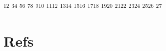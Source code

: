 \documentclass[
]{article}
\author{}
\date{}
\begin{document}
\textsuperscript{1}\textsuperscript{2}
\textsuperscript{3}\textsuperscript{4}
\textsuperscript{5}\textsuperscript{6}
\textsuperscript{7}\textsuperscript{8}
\textsuperscript{9}\textsuperscript{10}
\textsuperscript{11}\textsuperscript{12}
\textsuperscript{13}\textsuperscript{14}
\textsuperscript{15}\textsuperscript{16}
\textsuperscript{17}\textsuperscript{18}
\textsuperscript{19}\textsuperscript{20}
\textsuperscript{21}\textsuperscript{22}
\textsuperscript{23}\textsuperscript{24}
\textsuperscript{25}\textsuperscript{26} \textsuperscript{27}

\hypertarget{refs}{%
\section*{Refs}\label{refs}}
\end{document}

